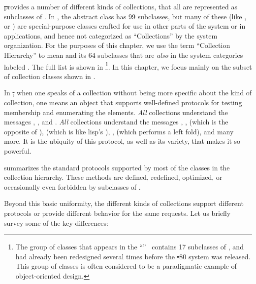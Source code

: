 \documentclass[a4paper,10pt,twoside]{book}
\begin{document}
\st provides a number of different kinds of collections, that all are represented as subclasses of . In \squeak, the abstract class  has 99 subclasses, but many of these (like \mbox{,} or ) are special-purpose classes crafted for use in other parts of the system or in applications, and hence not categorized as ``Collections'' by the system organization. For the purposes of this chapter, we use the term ``Collection Hierarchy'' to mean  and its 64 subclasses that are \emph{also} in the system categories labeled . The full list is shown in \footnote{The group of classes that appears in the ``''~\cite{Gold83a} contains 17 subclasses of , and had already been redesigned several times before the \st-80 system was released.
This group of classes is often considered to be a paradigmatic example of object-oriented design.}. In this chapter, we focus mainly on the subset of collection classes shown in .

In \st, when one speaks of a collection without being more specific about the kind of collection, one means an object that supports well-defined protocols for testing membership and enumerating the elements.
\emph{All} collections understand the  messages \mbox{,} , and \mbox{.}
\emph{All} collections understand the  messages , ,  (which is the opposite of ),  (which is like lisp's ), ,  (which performs a left fold), and many more.
It is the ubiquity of this protocol, as well as its variety, that makes it so powerful.

 summarizes the standard protocols supported by most of the classes in the collection hierarchy.
These methods are defined, redefined, optimized, or occasionally even forbidden by subclasses of .

Beyond this basic uniformity, the different kinds of collections support different protocols or provide different behavior for the same requests.
Let us briefly survey some of the key differences:
\end{document}
